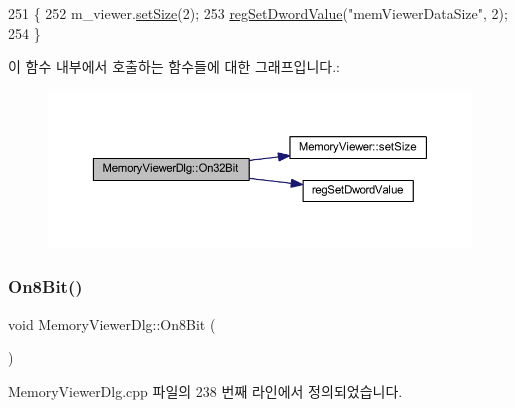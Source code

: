 \begin{DoxyCode}
251 \{
252   m\_viewer.\mbox{\hyperlink{class_memory_viewer_a185cb06e604ff1e0016b9be859c21387}{setSize}}(2);
253   \mbox{\hyperlink{_reg_8cpp_a758e775489a3fb5c3cc7071fdd5af87e}{regSetDwordValue}}(\textcolor{stringliteral}{"memViewerDataSize"}, 2);
254 \}
\end{DoxyCode}
이 함수 내부에서 호출하는 함수들에 대한 그래프입니다.\+:
\nopagebreak
\begin{figure}[H]
\begin{center}
\leavevmode
\includegraphics[width=350pt]{class_memory_viewer_dlg_afb8178dcad55d86c9217f89e0ed4814f_cgraph}
\end{center}
\end{figure}
\mbox{\label{class_memory_viewer_dlg_ad408c6c194db416a0cf23480184ef610}} 
\subsubsection{\texorpdfstring{On8\+Bit()}{On8Bit()}}
{\footnotesize\ttfamily void Memory\+Viewer\+Dlg\+::\+On8\+Bit (\begin{DoxyParamCaption}{ }\end{DoxyParamCaption})\hspace{0.3cm}{\ttfamily [protected]}}



Memory\+Viewer\+Dlg.\+cpp 파일의 238 번째 라인에서 정의되었습니다.


